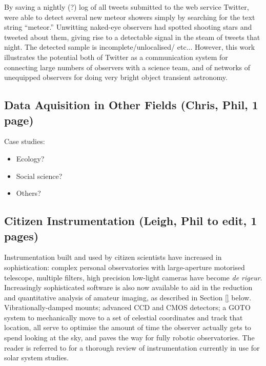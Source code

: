 \documentclass{ar2e}
\begin{document}
By saving a nightly (?) log of all tweets submitted to the web service
Twitter, \citet{Barentsen++2010} were able to 
detect several new meteor showers simply by searching for the text string
``meteor.'' Unwitting naked-eye observers had spotted shooting stars and
tweeted about them, giving rise to a detectable signal in the steam of tweets
that night. The detected sample is incomplete/unlocalised/ etc... However,
this work illustrates the potential both of Twitter as a communication system
for connecting large numbers of observers with a science team, and of networks
of unequipped observers for doing very bright object transient astronomy.



\subsection{Data Aquisition in Other Fields (\textbf{Chris}, Phil, 1 page)}
\label{sec:obs:non-astro}

Case studies:
\begin{itemize}
\item Ecology?
\item Social science?
\item Others?
\end{itemize}


\subsection{Citizen Instrumentation (\textbf{Leigh}, Phil to edit, 1 pages)}
\label{sec:instr}

Instrumentation built and used by citizen scientists have increased in
sophistication: complex personal observatories with large-aperture motorised
telescope, multiple filters, high precision low-light cameras have become {\it
de rigeur}.  Increasingly sophisticated software is also now available to aid
in the reduction and quantitative analysis of amateur imaging, as described in
Section \ref{} below.  Vibrationally-damped mounts; advanced CCD and CMOS
detectors; a GOTO system to mechanically move to a set of celestial
coordinates and track that location, all serve to optimise the amount of time
the observer actually gets to spend looking at the sky, and paves the way for
fully robotic observatories.  The reader is referred to \citet{13mousis} for a
thorough review of instrumentation currently in use for solar system studies.
\end{document}

